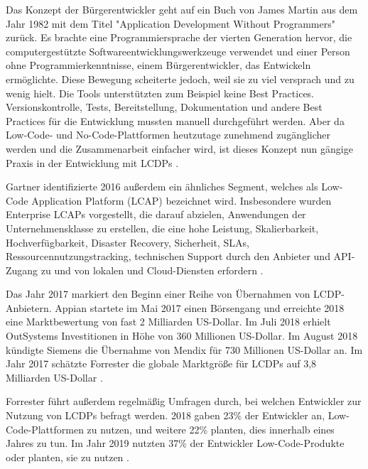 \documentclass[12pt]{article} %
\begin{document}
	Das Konzept der Bürgerentwickler geht auf ein Buch von James Martin aus dem Jahr 1982 mit dem Titel "Application Development Without Programmers" zurück. Es brachte eine Programmiersprache der vierten Generation hervor, die computergestützte Softwareentwicklungswerkzeuge verwendet und einer Person ohne Programmierkenntnisse, einem Bürgerentwickler, das Entwickeln ermöglichte. Diese Bewegung scheiterte jedoch, weil sie zu viel versprach und zu wenig hielt. Die Tools unterstützten zum Beispiel keine Best Practices. Versionskontrolle, Tests, Bereitstellung, Dokumentation und andere Best Practices für die Entwicklung mussten manuell durchgeführt werden. Aber da Low-Code- und No-Code-Plattformen heutzutage zunehmend zugänglicher werden und die Zusammenarbeit einfacher wird, ist dieses Konzept nun gängige Praxis in der Entwicklung mit LCDPs \cite{KevinShuler.2023}. \newline
	
	Gartner identifizierte 2016 außerdem ein ähnliches Segment, welches als Low-Code Application Platform (LCAP) bezeichnet wird. Insbesondere wurden Enterprise LCAPs vorgestellt, die darauf abzielen, Anwendungen der Unternehmensklasse zu erstellen, die eine hohe Leistung, Skalierbarkeit, Hochverfügbarkeit, Disaster Recovery, Sicherheit, SLAs, Ressourcennutzungstracking, technischen Support durch den Anbieter und API-Zugang zu und von lokalen und Cloud-Diensten erfordern \cite{DiRuscio.2022}. \newline %
	
	Das Jahr 2017 markiert den Beginn einer Reihe von Übernahmen von LCDP-Anbietern. Appian startete im Mai 2017 einen Börsengang und erreichte 2018 eine Marktbewertung von fast 2 Milliarden US-Dollar. Im Juli 2018 erhielt OutSystems Investitionen in Höhe von 360 Millionen US-Dollar. Im August 2018 kündigte Siemens die Übernahme von Mendix für 730 Millionen US-Dollar an. Im Jahr 2017 schätzte Forrester die globale Marktgröße für LCDPs auf 3,8 Milliarden US-Dollar \cite{DiRuscio.2022}. \newline 
		
	Forrester führt außerdem regelmäßig Umfragen durch, bei welchen Entwickler zur Nutzung von LCDPs befragt werden. 2018 gaben 23\% der Entwickler an, Low-Code-Plattformen zu nutzen, und weitere 22\% planten, dies innerhalb eines Jahres zu tun. Im Jahr 2019 nutzten 37\% der Entwickler Low-Code-Produkte oder planten, sie zu nutzen \cite{DiRuscio.2022}.\newline
	
\end{document}

